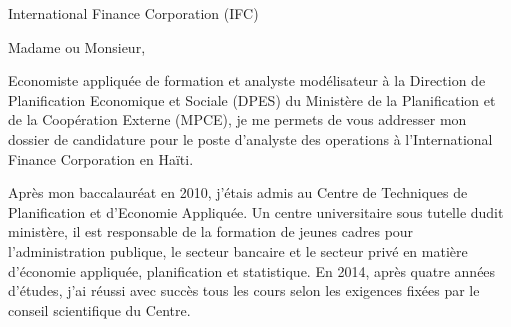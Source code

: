 \documentclass[12pt]{lettre}
\date{le  4 ao\^{u}t 2020}%
\makeatletter
\newcommand*{\NoRule}{\renewcommand*{\rule@length}{0}}
\makeatother
\begin{document}
\begin{letter}{
International Finance Corporation (IFC)
}
\address{
 Alexandro Disla\\
25, carefour Ism\'{e}, impasse F\'{e}n\'{e}lon\\
Pernier 23} 
\nofax{}
\signature{}
 
\NoRule
 
 
\opening{Madame ou Monsieur,}

Economiste appliqu\'{e}e de formation et analyste mod\'{e}lisateur
\`{a} la Direction de Planification Economique et Sociale (DPES) 
du Minist\`{e}re de la Planification et de la Coop\'{e}ration 
Externe (MPCE), je me permets de vous addresser mon dossier de candidature 
pour le poste d'analyste des operations \`{a} l'International Finance Corporation
en Ha\"{i}ti. 

Apr\`{e}s mon baccalaur\'{e}at en 2010, j'\'{e}tais admis au  Centre de Techniques
de Planification et d'Economie Appliqu\'{e}e. Un centre universitaire sous tutelle 
dudit minist\`{e}re, il est responsable de la formation de jeunes cadres pour 
l'administration publique, le secteur bancaire et le secteur  priv\'{e} 
en mati\`{e}re d'\'{e}conomie appliqu\'{e}e, planification et statistique. 
En 2014, apr\`{e}s quatre ann\'{e}es d'\'{e}tudes, j'ai r\'{e}ussi 
avec succ\`{e}s tous les cours selon les exigences fix\'{e}es
 par le conseil scientifique du Centre.


\end{letter}
\end{document}
